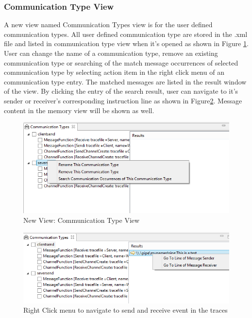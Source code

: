 \documentclass[paper=a4, fontsize=11pt]{scrartcl}
\numberwithin{equation}{section}		%
\numberwithin{figure}{section}			%
\numberwithin{table}{section}				%
\begin{document}
\subsubsection{Communication Type View}
A new view named Communication Types view is for the user defined communication types. All user defined communication type are stored in the .xml file and listed in communication type view when it's opened as shown in Figure \ref{CommunicationTypeview}. User can change the name of a communication type, remove an existing communication type or searching of the match message occurrences of selected communication type by selecting action item in the right click menu of an communication type entry. The matched messages are listed in the result window of the view. By clicking the entry of the search  result, user can navigate to it's sender or receiver's corresponding instruction line as shown in Figure\ref{searchresult}. Message content in the memory view will be shown as well.


\begin{figure}[h]
\includegraphics[scale=.9]{CommunicationTypeview}
 \caption{New View: Communication Type View}
\label{CommunicationTypeview}
\end{figure}

\begin{figure}[h]
\includegraphics[scale=.9]{searchresult}
 \caption{Right Click menu to navigate to send and receive event in the traces}
\label{searchresult}
\end{figure}
\end{document}
